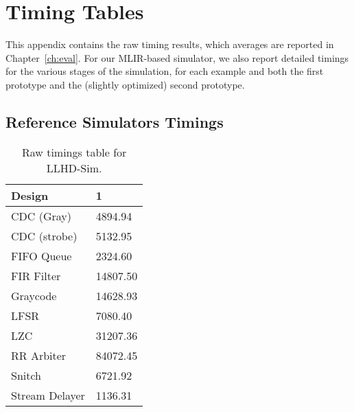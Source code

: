 \chapter{Timing Tables}
\label{app:timings}
This appendix contains the raw timing results, which averages are reported in Chapter~\ref{ch:eval}. For our MLIR-based simulator, we also report detailed timings for the various stages of the simulation, for each example and both the first prototype and the (slightly optimized) second prototype.

\section{Reference Simulators Timings}

\begin{table}[ht]
    \centering
    \begin{tabular}{ll}
        \toprule
        \textbf{Design} & \textbf{1} \\
        \toprule
        CDC (Gray)      & 4894.94    \\
        CDC (strobe)    & 5132.95    \\
        FIFO Queue      & 2324.60    \\
        FIR Filter      & 14807.50   \\
        Graycode        & 14628.93   \\
        LFSR            & 7080.40    \\
        LZC             & 31207.36   \\
        RR Arbiter      & 84072.45   \\
        Snitch          & 6721.92    \\
        Stream Delayer  & 1136.31    \\
        \bottomrule
    \end{tabular}
    \caption{Raw timings table for LLHD-Sim.}
\end{table}

